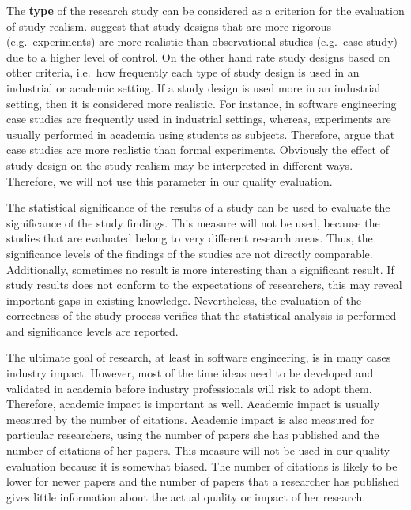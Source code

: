 The \textbf{type} of the research study can be considered as a criterion for the evaluation of study realism. \citep{Kitchenham2004} suggest that study designs that are more rigorous (e.g.\ experiments) are more realistic than observational studies (e.g.\ case study) due to a higher level of control. On the other hand \citep{Ivarsson2010} rate study designs based on other criteria, i.e.\ how frequently each type of study design is used in an industrial or academic setting. If a study design is used more in an industrial setting, then it is considered more realistic. For instance, in software engineering case studies are frequently used in industrial settings, whereas, experiments are usually performed in academia using students as subjects. Therefore, \citep{Ivarsson2010} argue that case studies are more realistic than  formal experiments. Obviously the effect of study design on the study realism may be interpreted in different ways. Therefore, we will not use this parameter in our quality evaluation.

The statistical significance of the results of a study can be used to evaluate the significance of the study findings.
This measure will not be used, because the studies that are evaluated belong to very different research areas.
Thus, the significance levels of the findings of the studies are not directly comparable.
Additionally, sometimes no result is more interesting than a significant result.
If study results does not conform to the expectations of researchers, this may reveal important gaps in existing knowledge.
Nevertheless, the evaluation of the correctness of the study process verifies that the statistical analysis is performed and significance levels are reported.

The ultimate goal of research, at least in software engineering, is in many cases industry impact. However, most of the time ideas need to be developed and validated in academia before industry professionals will risk to adopt them. Therefore, academic impact is important as well. Academic impact is usually measured by the number of citations. Academic impact is also measured for particular researchers, using the number of papers she has published and the number of citations of her papers.
This measure will not be used in our quality evaluation because it is somewhat biased. The number of citations is likely to be lower for newer papers and the number of papers that a researcher has published gives little information about the actual quality or impact of her research.

